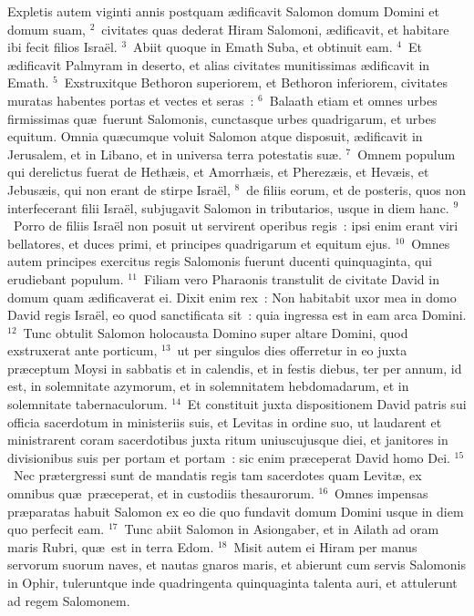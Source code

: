 \lettrine[lines=10,image=true,loversize=0.05,lraise=-0.03]{E}{}xpletis autem viginti annis postquam \ae dificavit Salomon domum Domini et domum suam,
${}^{2}$~civitates quas dederat Hiram Salomoni, \ae dificavit, et habitare ibi fecit filios Isra\"el.
${}^{3}$~Abiit quoque in Emath Suba, et obtinuit eam.
${}^{4}$~Et \ae dificavit Palmyram in deserto, et alias civitates munitissimas \ae dificavit in Emath.
${}^{5}$~Exstruxitque Bethoron superiorem, et Bethoron inferiorem, civitates muratas habentes portas et vectes et seras~:
${}^{6}$~Balaath etiam et omnes urbes firmissimas qu\ae\ fuerunt Salomonis, cunctasque urbes quadrigarum, et urbes equitum. Omnia qu\ae cumque voluit Salomon atque disposuit, \ae dificavit in Jerusalem, et in Libano, et in universa terra potestatis su\ae .
${}^{7}$~Omnem populum qui derelictus fuerat de Heth\ae is, et Amorrh\ae is, et Pherez\ae is, et Hev\ae is, et Jebus\ae is, qui non erant de stirpe Isra\"el,
${}^{8}$~de filiis eorum, et de posteris, quos non interfecerant filii Isra\"el, subjugavit Salomon in tributarios, usque in diem hanc.
${}^{9}$~Porro de filiis Isra\"el non posuit ut servirent operibus regis~: ipsi enim erant viri bellatores, et duces primi, et principes quadrigarum et equitum ejus.
${}^{10}$~Omnes autem principes exercitus regis Salomonis fuerunt ducenti quinquaginta, qui erudiebant populum.
${}^{11}$~Filiam vero Pharaonis transtulit de civitate David in domum quam \ae dificaverat ei. Dixit enim rex~: Non habitabit uxor mea in domo David regis Isra\"el, eo quod sanctificata sit~: quia ingressa est in eam arca Domini.
${}^{12}$~Tunc obtulit Salomon holocausta Domino super altare Domini, quod exstruxerat ante porticum,
${}^{13}$~ut per singulos dies offerretur in eo juxta pr\ae ceptum Moysi in sabbatis et in calendis, et in festis diebus, ter per annum, id est, in solemnitate azymorum, et in solemnitatem hebdomadarum, et in solemnitate tabernaculorum.
${}^{14}$~Et constituit juxta dispositionem David patris sui officia sacerdotum in ministeriis suis, et Levitas in ordine suo, ut laudarent et ministrarent coram sacerdotibus juxta ritum uniuscujusque diei, et janitores in divisionibus suis per portam et portam~: sic enim pr\ae ceperat David homo Dei.
${}^{15}$~Nec pr\ae tergressi sunt de mandatis regis tam sacerdotes quam Levit\ae , ex omnibus qu\ae\ pr\ae ceperat, et in custodiis thesaurorum.
${}^{16}$~Omnes impensas pr\ae paratas habuit Salomon ex eo die quo fundavit domum Domini usque in diem quo perfecit eam.
${}^{17}$~Tunc abiit Salomon in Asiongaber, et in Ailath ad oram maris Rubri, qu\ae\ est in terra Edom.
${}^{18}$~Misit autem ei Hiram per manus servorum suorum naves, et nautas gnaros maris, et abierunt cum servis Salomonis in Ophir, tuleruntque inde quadringenta quinquaginta talenta auri, et attulerunt ad regem Salomonem.

